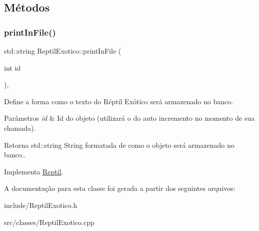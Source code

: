 \subsection{Métodos}
\mbox{\label{classReptilExotico_a71312f425b92e04d8f29a856abd83f26}} 
\subsubsection{\texorpdfstring{print\+In\+File()}{printInFile()}}
{\footnotesize\ttfamily std\+::string Reptil\+Exotico\+::print\+In\+File (\begin{DoxyParamCaption}\item[{int}]{id }\end{DoxyParamCaption})\hspace{0.3cm}{\ttfamily [protected]}, {\ttfamily [virtual]}}



Define a forma como o texto do Réptil Exótico será armazenado no banco. 


\begin{DoxyParams}{Parâmetros}
{\em id} & Id do objeto (utilizará o do auto incremento no momento de sua chamada). \\
\hline
\end{DoxyParams}
\begin{DoxyReturn}{Retorna}
std\+::string String formatada de como o objeto será armazenado no banco.. 
\end{DoxyReturn}


Implementa \hyperlink{classReptil_a53fd59f3aed9c2d463722a8e97401406}{Reptil}.



A documentação para esta classe foi gerada a partir dos seguintes arquivos\+:\begin{DoxyCompactItemize}
\item 
include/Reptil\+Exotico.\+h\item 
src/classes/Reptil\+Exotico.\+cpp\end{DoxyCompactItemize}
